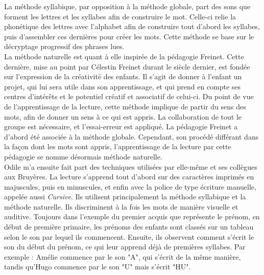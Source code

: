 La méthode syllabique, par opposition à la méthode globale, part des sons que forment les lettres et les syllabes afin de construire le mot. Celle-ci relie la phonétique des lettres avec l'alphabet afin de construire tout d'abord les syllabes, puis d'assembler ces dernières pour créer les mots. Cette méthode se base sur le décryptage progressif des phrases lues.\\

La méthode naturelle est quant à elle inspirée de la pédagogie Freinet. Cette dernière, mise au point par Célestin Freinet durant le siècle dernier, est fondée sur l'expression de la créativité des enfants. Il s'agit de donner à l'enfant un projet, qui lui sera utile dans son apprentissage, et qui prend en compte ses centres d'intérêts et le potentiel créatif et associatif de celui-ci. Du point de vue de l'apprentissage de la lecture, cette méthode implique de partir du sens des mots, afin de donner un sens à ce qui est appris. La collaboration de tout le groupe est nécessaire, et l'essai-erreur est appliqué. La pédagogie Freinet a d'abord été associée à la méthode globale. Cependant, son procédé différant dans la façon dont les mots sont appris, l'apprentissage de la lecture par cette pédagogie se nomme désormais méthode naturelle.\\

Odile m'a ensuite fait part des techniques utilisées par elle-même et ses collègues aux Bruyères. La lecture s'apprend tout d'abord sur des caractères imprimés en majuscules, puis en minuscules, et enfin avec la police de type écriture manuelle, appelée aussi \textit{Cursive}. Ils utilisent principalement la méthode syllabique et la méthode naturelle. Ils discriminent à la fois les mots de manière visuelle et auditive. Toujours dans l'exemple du premier acquis que représente le prénom, en début de première primaire, les prénoms des enfants sont classés sur un tableau selon le son par lequel ils commencent. Ensuite, ils observent comment s'écrit le son du début du prénom, ce qui leur apprend déjà de premières syllabes. Par exemple : Amélie commence par le son "A", qui s'écrit de la même manière, tandis qu'Hugo commence par le son "U" mais s'écrit "HU".\\

